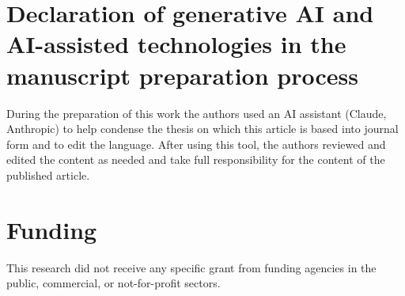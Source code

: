 \documentclass[preprint,review,12pt]{elsarticle}\usepackage{lineno}\linenumbers
\begin{document}
\section*{Declaration of generative AI and AI-assisted technologies in the manuscript preparation process}
During the preparation of this work the authors used an AI assistant (Claude, Anthropic) to help condense the thesis on which this article is based into journal form and to edit the language. After using this tool, the authors reviewed and edited the content as needed and take full responsibility for the content of the published article.

\section*{Funding}
This research did not receive any specific grant from funding agencies in the public, commercial, or not-for-profit sectors.



\end{document}
